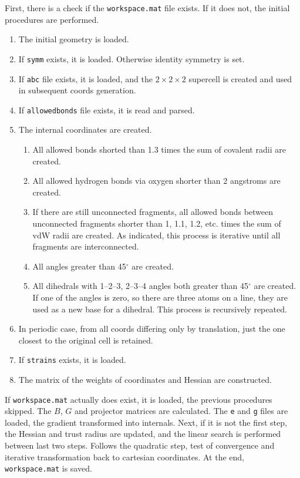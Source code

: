 \documentclass[12pt,a4]{article}
\newcommand{\ttt}{\texttt}
\begin{document}
First, there is a check if the \ttt{workspace.mat} file exists. If it does not, the initial procedures are performed.
\begin{enumerate}
\item The initial geometry is loaded.
\item If \ttt{symm} exists, it is loaded. Otherwise identity symmetry is set.
\item If \ttt{abc} file exists, it is loaded, and the $2\times2\times2$ supercell is created and used in subsequent coords generation.
\item If \ttt{allowedbonds} file exists, it is read and parsed.
\item The internal coordinates are created.
\begin{enumerate}
\item All allowed bonds shorted than 1.3 times the sum of covalent radii are created.
\item All allowed hydrogen bonds via oxygen shorter than 2 angstroms are created.
\item If there are still unconnected fragments, all allowed bonds between unconnected fragments shorter than 1, 1.1, 1.2, etc. times the sum of vdW radii are created. As indicated, this process is iterative until all fragments are interconnected.
\item All angles greater than 45$^\circ$ are created.
\item All dihedrals with 1--2--3, 2--3--4 angles both greater than 45$^\circ$ are created. If one of the angles is zero, so there are three atoms on a line, they are used as a new base for a dihedral. This process is recursively repeated.
\end{enumerate}
\item In periodic case, from all coords differing only by translation, just the one closest to the original cell is retained.
\item If \ttt{strains} exists, it is loaded.
\item The matrix of the weights of coordinates and Hessian are constructed.
\end{enumerate}

If \ttt{workspace.mat} actually does exist, it is loaded, the previous procedures skipped. The $B$, $G$ and projector matrices are calculated. The \ttt{e} and \ttt{g} files are loaded, the gradient transformed into internals. Next, if it is not the first step, the Hessian and trust radius are updated, and the linear search is performed between last two steps. Follows the quadratic step, test of convergence and iterative transformation back to cartesian coordinates. At the end, \ttt{workspace.mat} is saved.
\end{document}
